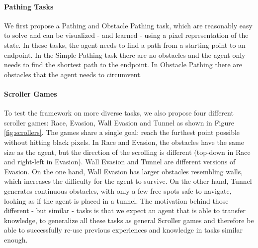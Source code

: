 \paragraph{Pathing Tasks}
We first propose a Pathing and Obstacle Pathing task, which are reasonably easy to solve and can be visualized - and learned - using a pixel representation of the state.
In these tasks, the agent needs to find a path from a starting point to an endpoint. 
In the Simple Pathing task there are no obstacles and the agent only needs to find the shortest path to the endpoint. 
In Obstacle Pathing there are obstacles that the agent needs to circumvent.

\paragraph{Scroller Games}
To test the framework on more diverse tasks, we also propose four different scroller games:
Race, Evasion, Wall Evasion and Tunnel as shown in Figure \ref{fig:scrollers}. The games share a single goal: reach the furthest point possible without hitting black pixels. 
In Race and Evasion, the obstacles have the same size as the agent, but the direction of the scrolling is different (top-down in Race and right-left in Evasion). Wall Evasion and Tunnel are different versions of Evasion. 
On the one hand, Wall Evasion has larger obstacles resembling walls, which increases the difficulty for the agent to survive. 
On the other hand, Tunnel generates continuous obstacles, with only a few free spots safe to navigate, looking as if the agent is placed in a tunnel. 
The motivation behind those different - but similar - tasks is that we expect an agent that is able to transfer knowledge, to generalize all these tasks as general Scroller games and therefore be able to successfully re-use previous experiences and knowledge in tasks similar enough.

